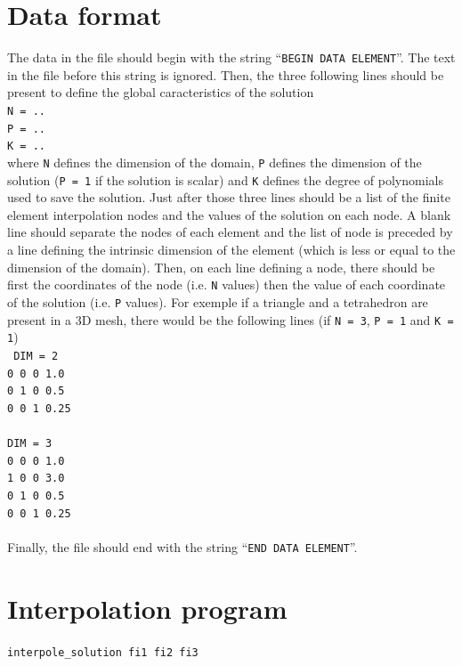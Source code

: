 \documentclass[11pt,a4paper]{article}
\begin{document}
\section{Data format}
The data in the file should begin with the string ``{\tt BEGIN DATA ELEMENT}''. The text in the file before this string is ignored. Then, the three following lines should be present to define the global caracteristics of the solution\\[0.5cm]
{\tt N = ..\\
  P = ..\\
  K = ..\\
}
where {\tt N} defines the dimension of the domain, {\tt P} defines the dimension of the solution ({\tt P = 1} if the solution is scalar) and {\tt K} defines the degree of polynomials used to save the solution. Just after those three lines should be a list of the finite element interpolation nodes and the values of the solution on each node. A blank line should separate the nodes of each element and the list of node is preceded by a line defining the intrinsic dimension of the element (which is less or equal to the dimension of the domain). Then, on each line defining a node, there should be first the coordinates of the node (i.e. {\tt N} values) then the value of each coordinate of the solution (i.e. {\tt P} values). For exemple if a triangle and a tetrahedron are present in a 3D mesh, there would be the following lines (if {\tt N = 3}, {\tt P = 1} and {\tt K = 1})\\[0.5cm]
{\tt 
  DIM = 2 \\
  0 0 0 1.0 \\
  0 1 0 0.5 \\
  0 0 1 0.25 \\
  \\
  DIM = 3 \\
  0 0 0 1.0 \\
  1 0 0 3.0 \\
  0 1 0 0.5 \\
  0 0 1 0.25 \\
  \\
}
Finally, the file should end with the string ``{\tt END DATA ELEMENT}''.

\section{Interpolation program}

{\tt interpole\_solution fi1 fi2 fi3} \\[0.5cm]
\end{document}
